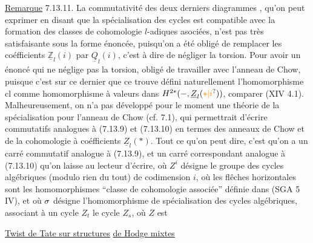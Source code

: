  \uline{Remarque} 7.13.11. La commutativité des deux derniers diagrammes , qu'on peut exprimer en disant que la spécialisation des cycles  est compatible avec la formation des classes de cohomologie $l$-adiques asociées, n'est pas très satisfaisante sous la forme énoncée, puisqu'on  a été obligé de remplacer les coéfficients $\underline{\mathbb Z}_{l}(i)$ par $\underline{Q}_{l}(i)$, c'est à dire de négliger la torsion. Pour avoir un énoncé qui ne néglige pas la torsion,  obligé de travailler avec l'anneau de Chow, puisque c'est sur ce dernier que ce trouve défini naturellement l'homomorphisme $\mathrm{cl}$ comme homomorphisme à valeurs dans $H^{2*}(-,\underline{Z}_{l}(\unsure{*|i}))$,  comparer (XIV 4.1). Malheureusement, on n'a pas développé pour le moment une théorie de la spécialisation pour l'anneau de Chow\deleted{\unsure{,}} (cf. 7.1), qui permettrait d'écrire  commutatifs analogues à (7.13.9) et (7.13.10) en termes des anneaux de Chow et de la cohomologie à coéfficients $\underline{Z}_{l}(*)$. Tout ce qu'on peut dire, c'est qu'on a un carré commutatif
 analogue à (7.13.9), et un carré correspondant analogue à (7.13.10) qu'on laisse au lecteur  d'écrire, où $Z^i$ désigne le groupe des cycles algébriques (modulo rien du tout) de codimension $i$,  où les flêches horizontales sont les homomorphismes ``classe de cohomologie associée'' définie dans (SGA 5 IV), et où $\sigma$ désigne l'homomorphisme de spécialisation des cycles algébriques, associant à un cycle $Z_t$ le cycle $Z_s$, où $Z$ est

\uline{Twist de Tate sur structures} \uline{de Hodge mixtes}


